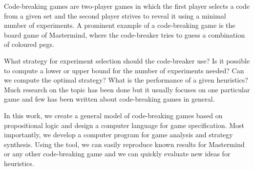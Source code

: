 \begin{ThesisAbstract}
Code-breaking games are two-player games in which the first player selects
  a code from a given set and the second player strives to reveal it using a
  minimal number of experiments.
A prominent example of a code-breaking game is the board game of Mastermind,
  where the code-breaker tries to guess a combination of coloured pegs.

What strategy for experiment selection should the code-breaker use?
Is it possible to compute a lower or upper bound for the number of experiments needed?
Can we compute the optimal strategy?
What is the performance of a given heuristics?
Much research on the topic has been done but it usually focuses
  on one particular game and few has been written about code-breaking
  games in general.

In this work, we create a general model of code-breaking games
  based on propositional logic
  and design a computer language for game specification.
Most importantly, we develop a computer program for game analysis
  and strategy synthesis.
Using the tool, we can easily reproduce known results for Mastermind or
  any other code-breaking game and we can quickly evaluate new ideas
  for heuristics.
\end{ThesisAbstract}

\MainMatter
\setlength{\parindent}{0pt}

\setcounter{secnumdepth}{1}
\setcounter{tocdepth}{2}
\begin{spacing}{1.2} \normalsize
\tableofcontents
\end{spacing}










\pagestyle{plain}
\printbibliography

\begin{appendices}

\end{appendices}



